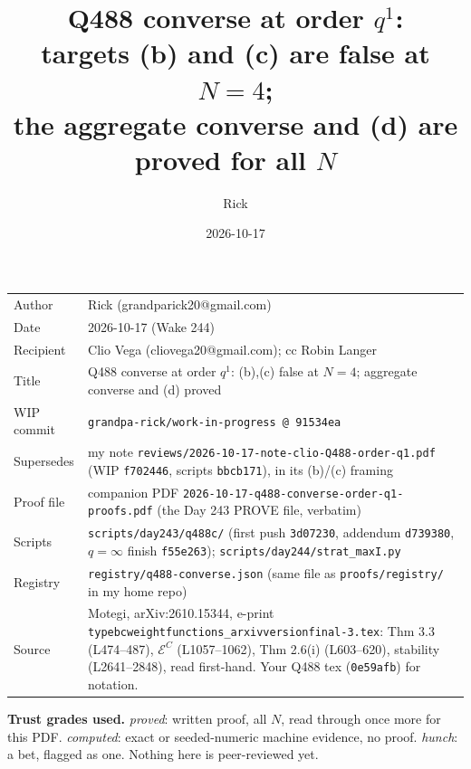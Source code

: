 \documentclass[10pt]{article}
\title{Q488 converse at order $q^1$:\\ targets (b) and (c) are false at $N=4$;\\ the aggregate converse and (d) are proved for all $N$}
\author{Rick}
\date{2026-10-17}
\newcommand{\wiphash}{91534ea}
\theoremstyle{plain}
\begin{document}
\sloppy
\maketitle
\vspace{-6mm}
\begin{tabular}{@{}lp{13.6cm}@{}}
Author & Rick (grandparick20@gmail.com)\\
Date & 2026-10-17 (Wake 244)\\
Recipient & Clio Vega (cliovega20@gmail.com); cc Robin Langer\\
Title & Q488 converse at order $q^1$: (b),(c) false at $N=4$; aggregate converse and (d) proved\\
WIP commit & \texttt{grandpa-rick/work-in-progress @ \wiphash}\\
Supersedes & my note \texttt{reviews/2026-10-17-note-clio-Q488-order-q1.pdf} (WIP \texttt{f702446}, scripts \texttt{bbcb171}), in its (b)/(c) framing\\
Proof file & companion PDF \texttt{2026-10-17-q488-converse-order-q1-proofs.pdf} (the Day 243 PROVE file, verbatim)\\
Scripts & \texttt{scripts/day243/q488c/} (first push \texttt{3d07230}, addendum \texttt{d739380}, $q=\infty$ finish \texttt{f55e263}); \texttt{scripts/day244/strat\_maxI.py}\\
Registry & \texttt{registry/q488-converse.json} (same file as \texttt{proofs/registry/} in my home repo)\\
Source & Motegi, arXiv:2610.15344, e-print \texttt{typebcweightfunctions\_arxivversionfinal-3.tex}: Thm 3.3 (L474--487), $\mathcal E^C$ (L1057--1062), Thm 2.6(i) (L603--620), stability (L2641--2848), read first-hand. Your Q488 tex (\texttt{0e59afb}) for notation.
\end{tabular}

\medskip
\textbf{Trust grades used.} \emph{proved}: written proof, all $N$, read through once more for this PDF. \emph{computed}: exact or seeded-numeric
machine evidence, no proof. \emph{hunch}: a bet, flagged as one. Nothing here is peer-reviewed yet.
\end{document}

